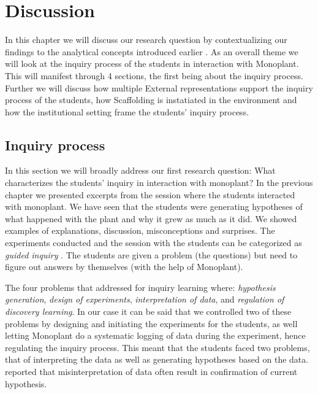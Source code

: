 \chapter{Discussion}
In this chapter we will discuss our research question by contextualizing our findings to the analytical concepts introduced earlier . As an overall theme we will look at the inquiry process of the students in interaction with Monoplant. This will manifest through 4 sections, the first being about the inquiry process. Further we will discuss how multiple External representations support the inquiry process of the students, how Scaffolding is instatiated in the environment and how the institutional setting frame the students' inquiry process.

\section{Inquiry process}
In this section we will broadly address our first research question: What characterizes the students’ inquiry in interaction with monoplant? 
In the previous chapter we presented excerpts from the session where the students interacted with monoplant. We have seen that the students were generating hypotheses of what happened with the plant and why it grew as much as it did. We showed examples of explanations, discussion, misconceptions and surprises. 
The experiments conducted and the session with the students can be categorized as \emph{guided inquiry} \citeauthor*{staver1987analysis} \citetext{\citeyear{staver1987analysis}, referenced in \citealp{prince2006inductive}}. The students are given a problem (the questions) but need to figure out answers by themselves (with the help of Monoplant). 

The four problems that \citep{de1998scientific} addressed for inquiry learning where: \textit{hypothesis generation}, \textit{design of experiments}, \textit{interpretation of data}, and \textit{regulation of discovery learning}. In our case it can be said that we controlled two of these problems by designing and initiating the experiments for the students, as well letting Monoplant do a systematic logging of data during the experiment, hence regulating the inquiry process. This meant that the students faced two problems, that of interpreting the data as well as generating hypotheses based on the data. \citeauthor*{klahr1993heuristics} \citetext{\citeyear{klahr1993heuristics}, referenced in \citealp{de1998scientific}} reported that misinterpretation of data often result in confirmation of current hypothesis. 

